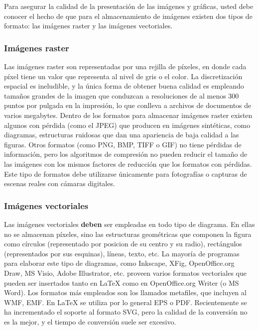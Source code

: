 Para asegurar la calidad de la presentación de las imágenes y
gráficas, usted debe conocer el hecho de que para el almacenamiento de
imágenes existen dos tipos de formato: las imágenes raster y las
imágenes vectoriales.

\subsubsection{Imágenes raster}
Las imágenes raster son representadas por una rejilla de píxeles, en donde cada
píxel tiene un valor que representa al nivel de gris o el color. La
discretización espacial es ineludible, y la única forma de obtener buena
calidad es empleando tamaños grandes de la imagen que conduzcan a resoluciones
de al menos 300 puntos por pulgada en la impresión, lo que conlleva a archivos
de documentos de varios megabytes. Dentro de los formatos para almacenar
imágenes raster existen algunos con pérdida (como el JPEG) que producen en
imágenes sintéticas, como diagramas, estructuras ruidosas que dan una
apariencia de baja calidad a las figuras. Otros formatos (como PNG, BMP, TIFF o
GIF) no tiene pérdidas de información, pero los algoritmos de compresión no
pueden reducir el tamaño de las imágenes con los mismos factores de reducción
que los formatos con pérdidas. Este tipo de formatos debe utilizarse únicamente
para fotografías o capturas de escenas reales con cámaras digitales.

\subsubsection{Imágenes vectoriales}

 Las imágenes vectoriales \textbf{deben} ser
empleadas en todo tipo de diagrama. En ellas no se almacenan píxeles,
sino las estructuras geométricas que componen la figura como círculos
(representado por posicion de su centro y su radio), rectángulos
(representados por sus esquinas), líneas, texto, etc. La mayoría de
programas para elaborar este tipo de diagramas, como Inkscape, XFig,
OpenOffice.org Draw, MS Visio, Adobe Illustrator, etc. proveen varios
formatos vectoriales que pueden ser insertados tanto en LaTeX como en
OpenOffice.org Writer (o MS Word). Los formatos más empleados son los
llamados metafiles, que incluyen al WMF, EMF. En LaTeX se utiliza por
lo general EPS o PDF. Recientemente se ha incrementado el soporte al
formato SVG, pero la calidad de la conversión no es la mejor, y el
tiempo de conversión suele ser excesivo.  

